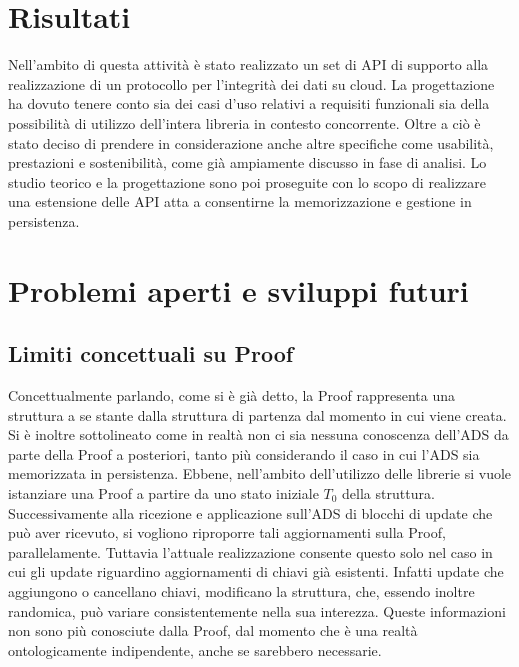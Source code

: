 \section{Risultati}


	Nell'ambito di questa attività è stato realizzato un set di API di supporto alla realizzazione di un protocollo per l'integrità dei dati su cloud. La progettazione ha dovuto tenere conto sia dei casi d'uso relativi a requisiti funzionali sia della possibilità di utilizzo dell'intera libreria in contesto concorrente. Oltre a ciò è stato deciso di prendere in considerazione anche altre specifiche come usabilità, prestazioni e sostenibilità, come già ampiamente discusso in fase di analisi. Lo studio teorico e la progettazione sono poi proseguite con lo scopo di realizzare una estensione delle API atta a consentirne la memorizzazione e gestione in persistenza.

\section{Problemi aperti e sviluppi futuri}

	\subsection{Limiti concettuali su Proof}
	

		Concettualmente parlando, come si è già detto, la Proof rappresenta una struttura a se stante dalla struttura di partenza dal momento in cui viene creata. Si è inoltre sottolineato come in realtà non ci sia nessuna conoscenza dell'ADS da parte della Proof a posteriori, tanto più considerando il caso in cui l'ADS sia memorizzata in persistenza.
		Ebbene, nell'ambito dell'utilizzo delle librerie si vuole istanziare una Proof a partire da uno stato iniziale $ T_{0} $ della struttura. Successivamente alla ricezione e applicazione sull'ADS di blocchi di update che può aver ricevuto, si vogliono riproporre tali aggiornamenti sulla Proof, parallelamente. Tuttavia l'attuale realizzazione consente questo solo nel caso in cui gli update riguardino aggiornamenti di chiavi già esistenti. Infatti update che aggiungono o cancellano chiavi, modificano la struttura, che, essendo inoltre randomica, può variare consistentemente nella sua interezza. Queste informazioni non sono più conosciute dalla Proof, dal momento che è una realtà ontologicamente indipendente, anche se sarebbero necessarie.
	
